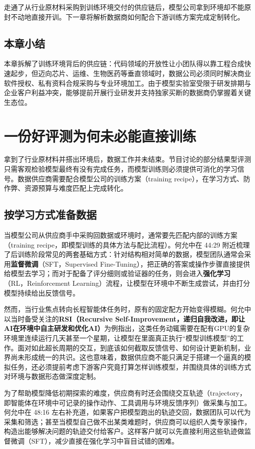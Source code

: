 \documentclass[UTF8,a4paper,11pt,fontset=fandol]{ctexart}
\begin{document}
走通了从行业原材料采购到训练环境交付的供应链后，模型公司拿到环境却不能原封不动地直接开训。下一章将解析数据商如何配合下游训练方案完成定制转化。
\subsection{本章小结}
本章拆解了训练环境背后的供应链：代码领域的开放性让小团队得以靠工程合成快速起步，但迈向芯片、运维、生物医药等垂直领域时，数据公司必须同时解决商业软件授权、私有资料合规采购与专业环境加工。由于模型实验室受限于研发排期与企业客户利益冲突，能够提前开展行业研发并支持独家买断的数据商仍掌握着关键生态位。
\section{一份好评测为何未必能直接训练}
拿到了行业原材料并搭出环境后，数据工作并未结束。节目讨论的部分结果型评测只需客观检验模型最终有没有完成任务，而模型训练则必须提供可消化的学习信号。数据供应商需要配合模型公司的训练方案（training recipe），在学习方式、防作弊、资源预算与难度匹配上完成转化。
\subsection{按学习方式准备数据}
当模型公司从供应商手中采购回数据或环境时，通常要先匹配内部的训练方案（training recipe，即模型训练的具体方法与配比流程）。何允中在 44:29 附近梳理了后训练阶段常见的两套基础方式：针对结构相对简单的数据，模型团队通常会采用\textbf{监督微调}（SFT，Supervised Fine-Tuning），把正确的答案或操作步骤直接提供给模型去学习；而对于配备了评分细则或验证器的任务，则会进入\textbf{强化学习}（RL，Reinforcement Learning）流程，让模型在环境中不断生成尝试，并由打分模型持续给出反馈信号。

然而，当行业焦点转向长程智能体任务时，原有的固定配方开始变得模糊。何允中以当时备受关注的\textbf{RSI（Recursive Self-Improvement，递归自我改进，即让AI在环境中自主研发和优化AI）}为例指出，这类任务动辄需要在配有GPU的复杂环境里连续运行几天甚至一个星期，让模型在里面真正执行“模型训练模型”的工作。面对如此超长周期的交互，到底该如何截取反馈信号、如何设计更新机制，业界尚未形成统一的共识。这也意味着，数据供应商不能只满足于搭建一个逼真的模拟任务，还必须提前考虑下游客户究竟打算怎样训练模型，并围绕具体的训练方式对环境与数据形态做深度定制。

为了帮助模型降低初期探索的难度，供应商有时还会围绕交互轨迹（trajectory，即智能体在环境中可记录的操作动作、工具调用与环境反馈序列）做采集与加工。何允中在 48:16 左右补充道，如果客户把模型跑出的轨迹交回，数据团队可以代为采集和筛选；甚至当模型自己做不出某类难题时，供应商可以组织人类专家操作，构造出能够解决问题的轨迹交付给客户。这样客户就可以先直接利用这些轨迹做监督微调（SFT），减少直接在强化学习中盲目试错的困难。
\end{document}
